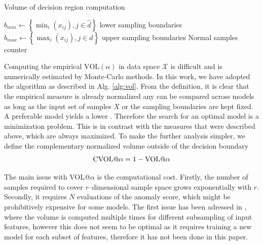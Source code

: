 \begin{algorithm}
    \caption{Volume of decision region computation}
    \label{alg:vol}
    \begin{algorithmic}[1]
    \State$b_{min} \gets \left\{ \min_{i}(x_{ij}),j\in\hat{d}\right\}$ lower sampling boundaries
    \State$b_{max} \gets \left\{ \max_{i}(x_{ij}),j\in\hat{d}\right\}$ upper sampling boundaries
     Normal samples counter
      \EndIf
    \EndFor
    \end{algorithmic}
\end{algorithm}

Computing the empirical $\text{VOL}(\alpha)$ in data space $\mathcal{X}$ is difficult and is numerically estimated by Monte-Carlo methods. In this work, we have adopted the algorithm as described in Alg. \ref{alg:vol}. From the definition, it is clear that the empirical measure is already normalized any can be compared across models as long as the input set of samples $X$ or the sampling boundaries are kept fixed. A preferable model yields a lower \vola. Therefore the search for an optimal model is a minimization problem. This is in contrast with the measures that were described above, which are always maximized. To make the further analysis simpler, we define the complementary normalized volume outside of the decision boundary
  \begin{equation}
    \textrm{CVOL@}\alpha = 1-\textrm{VOL@}\alpha
  \end{equation}

The main issue with VOL@$\alpha$ is the computational cost. Firstly, the number of samples required to cover $r$--dimensional sample space grows exponentially with $r$. Secondly, it requires $N$ evaluations of the anomaly score, which might be prohibitively expensive for some models. The first issue has been adressed in \cite{goix2016evaluate}, where the volume is computed multiple times for different subsampling of input features, however this does not seem to be optimal as it requires training a new model for each subset of features, therefore it has not been done in this paper.


